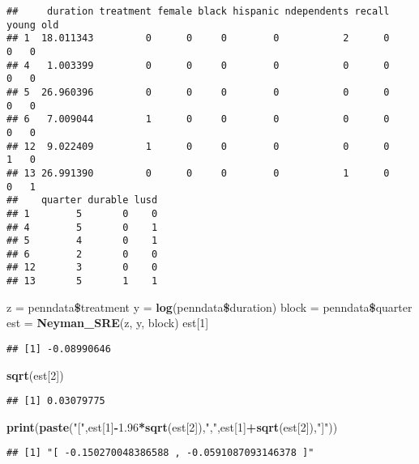 \documentclass[]{article}
\newenvironment{Shaded}{\begin{snugshade}}{\end{snugshade}}
\newcommand{\KeywordTok}[1]{\textcolor[rgb]{0.13,0.29,0.53}{\textbf{#1}}}
\newcommand{\DecValTok}[1]{\textcolor[rgb]{0.00,0.00,0.81}{#1}}
\newcommand{\FloatTok}[1]{\textcolor[rgb]{0.00,0.00,0.81}{#1}}
\newcommand{\StringTok}[1]{\textcolor[rgb]{0.31,0.60,0.02}{#1}}
\newcommand{\OperatorTok}[1]{\textcolor[rgb]{0.81,0.36,0.00}{\textbf{#1}}}
\newcommand{\NormalTok}[1]{#1}
\begin{document}
\begin{verbatim}
##     duration treatment female black hispanic ndependents recall young old
## 1  18.011343         0      0     0        0           2      0     0   0
## 4   1.003399         0      0     0        0           0      0     0   0
## 5  26.960396         0      0     0        0           0      0     0   0
## 6   7.009044         1      0     0        0           0      0     0   0
## 12  9.022409         1      0     0        0           0      0     1   0
## 13 26.991390         0      0     0        0           1      0     0   1
##    quarter durable lusd
## 1        5       0    0
## 4        5       0    1
## 5        4       0    1
## 6        2       0    0
## 12       3       0    0
## 13       5       1    1
\end{verbatim}

\begin{Shaded}
\begin{Highlighting}[]
\NormalTok{z =}\StringTok{ }\NormalTok{penndata}\OperatorTok{\$}\NormalTok{treatment}
\NormalTok{y =}\StringTok{ }\KeywordTok{log}\NormalTok{(penndata}\OperatorTok{\$}\NormalTok{duration)}
\NormalTok{block =}\StringTok{ }\NormalTok{penndata}\OperatorTok{\$}\NormalTok{quarter}
\NormalTok{est =}\StringTok{ }\KeywordTok{Neyman_SRE}\NormalTok{(z, y, block)}
\NormalTok{est[}\DecValTok{1}\NormalTok{]}
\end{Highlighting}
\end{Shaded}

\begin{verbatim}
## [1] -0.08990646
\end{verbatim}

\begin{Shaded}
\begin{Highlighting}[]
\KeywordTok{sqrt}\NormalTok{(est[}\DecValTok{2}\NormalTok{])}
\end{Highlighting}
\end{Shaded}

\begin{verbatim}
## [1] 0.03079775
\end{verbatim}

\begin{Shaded}
\begin{Highlighting}[]
\KeywordTok{print}\NormalTok{(}\KeywordTok{paste}\NormalTok{(}\StringTok{"["}\NormalTok{,est[}\DecValTok{1}\NormalTok{]}\OperatorTok{-}\FloatTok{1.96}\OperatorTok{*}\KeywordTok{sqrt}\NormalTok{(est[}\DecValTok{2}\NormalTok{]),}\StringTok{","}\NormalTok{,est[}\DecValTok{1}\NormalTok{]}\OperatorTok{+}\KeywordTok{sqrt}\NormalTok{(est[}\DecValTok{2}\NormalTok{]),}\StringTok{"]"}\NormalTok{))}
\end{Highlighting}
\end{Shaded}

\begin{verbatim}
## [1] "[ -0.150270048386588 , -0.0591087093146378 ]"
\end{verbatim}
\end{document}
